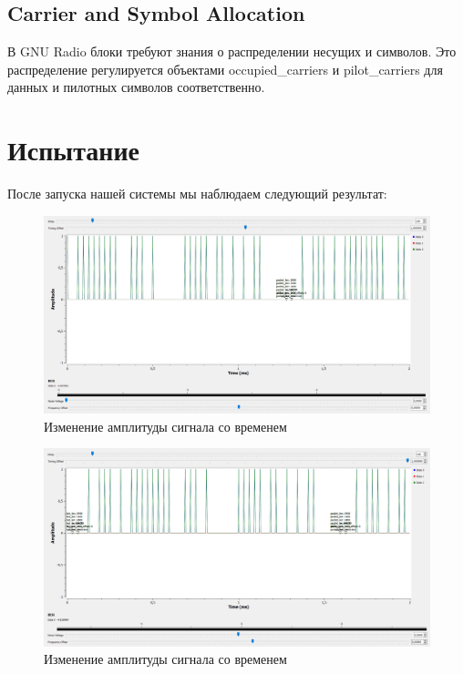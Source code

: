 \subsection{Carrier and Symbol Allocation}
В GNU Radio блоки требуют знания о распределении несущих и символов. Это распределение регулируется объектами occupied\_carriers и pilot\_carriers для данных и пилотных символов соответственно.

\section{Испытание}
После запуска нашей системы мы наблюдаем следующий результат:
\begin{figure}[H]
    \centering
    \includegraphics[width=1.0\linewidth]{Image2.png}
    \caption{Изменение амплитуды сигнала со временем}
    \label{fig:signal-amplitude}
\end{figure}
\begin{figure}[H]
    \centering
    \includegraphics[width=1.0\linewidth]{Image3.png}
    \caption{Изменение амплитуды сигнала со временем}
    \label{fig:signal-amplitude2}
\end{figure}
